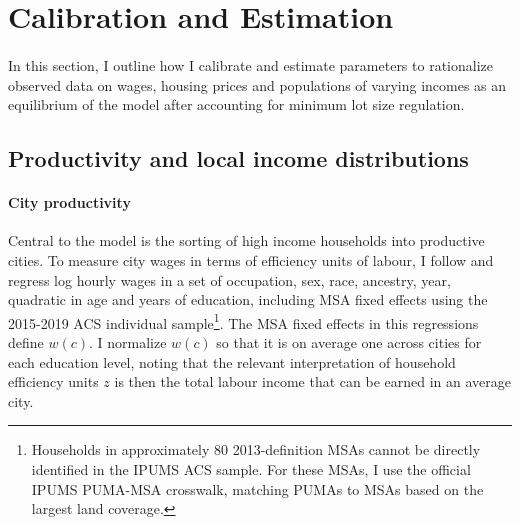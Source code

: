 \documentclass[11pt]{article}
\begin{document}
\section{Calibration and Estimation}\label{Section:CalibrationEstimation}

\paragraph{}
In this section, I outline how I calibrate and estimate parameters to rationalize observed data on wages, housing prices and populations of varying incomes as an equilibrium of the model after accounting for minimum lot size regulation. 

\subsection{Productivity and local income distributions}

\paragraph*{City productivity} Central to the model is the sorting of high income households into productive cities. To measure city wages in terms of efficiency units of labour, I follow \cite{ineqincreased} and regress log hourly wages in a set of occupation, sex, race, ancestry, year, quadratic in age and years of education, including MSA fixed effects using the 2015-2019 ACS individual sample\footnote{Households in approximately 80 2013-definition MSAs cannot be directly identified in the IPUMS ACS sample. For these MSAs, I use the official IPUMS PUMA-MSA crosswalk, matching PUMAs to MSAs based on the largest land coverage.}. The MSA fixed effects in this regressions define $w(c)$. I normalize $w(c)$ so that it is on average one across cities for each education level, noting that the relevant interpretation of household efficiency units $z$ is then the total labour income that can be earned in an average city.
\end{document}
